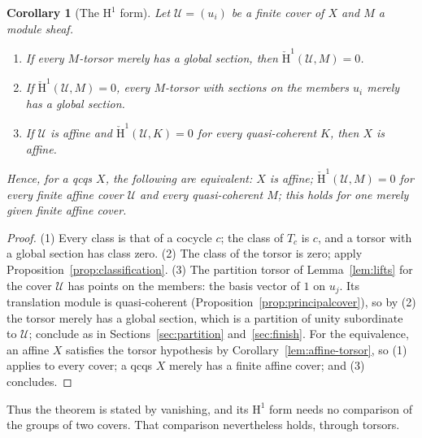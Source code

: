 \documentclass[11pt]{amsart}
\newtheorem{corollary}[theorem]{Corollary}
\theoremstyle{definition}\newtheorem{definition}[theorem]{Definition}
\theoremstyle{remark}\newtheorem{remark}[theorem]{Remark}
\newcommand{\HH}{\mathrm H}
\newcommand{\CC}{\check{\mathrm H}}
\begin{document}
\begin{corollary}[The \texorpdfstring{$\HH^1$}{H1} form]\label{cor:coverindependence}
Let $\mathcal U=(u_i)$ be a finite cover of $X$ and $M$ a module sheaf.
\begin{enumerate}
\item If every $M$-torsor merely has a global section, then
 $\CC^1(\mathcal U,M)=0$.
\item If $\CC^1(\mathcal U,M)=0$, every $M$-torsor with sections on the
 members $u_i$ merely has a global section.
\item If $\mathcal U$ is affine and $\CC^1(\mathcal U,K)=0$ for every
 quasi-coherent $K$, then $X$ is affine.
\end{enumerate}
Hence, for a qcqs $X$, the following are equivalent: $X$ is affine;
$\CC^1(\mathcal U,M)=0$ for every finite affine cover $\mathcal U$ and
every quasi-coherent $M$; this holds for one merely given finite affine
cover.
\end{corollary}
\begin{proof}
(1) Every class is that of a cocycle $c$; the class of $T_c$ is $c$,
and a torsor with a global section has class zero.
(2) The class of the torsor is zero; apply
Proposition~\ref{prop:classification}.
(3) The partition torsor of Lemma~\ref{lem:lifts} for the cover
$\mathcal U$ has points on the members: the basis vector of $1$ on
$u_j$. Its translation module is quasi-coherent
(Proposition~\ref{prop:principalcover}), so by (2) the torsor merely has
a global section, which is a partition of unity subordinate to
$\mathcal U$; conclude as in Sections~\ref{sec:partition}
and~\ref{sec:finish}. For the equivalence, an affine $X$ satisfies the
torsor hypothesis by Corollary~\ref{lem:affine-torsor}, so (1) applies
to every cover; a qcqs $X$ merely has a finite affine cover; and (3)
concludes.
\end{proof}

Thus the theorem is stated by vanishing, and its $\HH^1$ form needs no
comparison of the groups of two covers. That comparison nevertheless
holds, through torsors.
\end{document}
